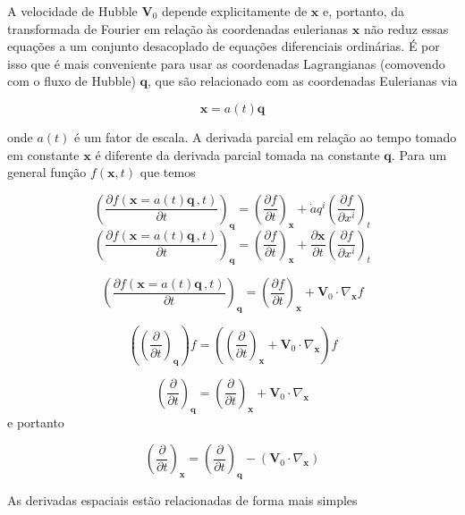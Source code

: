 \documentclass[a4paper,12pt]{article}
\begin{document}
A velocidade de Hubble $\mathbf{V}_0$ depende explicitamente de $\mathbf{x}$ e, portanto, da transformada de Fourier em relação às coordenadas eulerianas $\mathbf{x}$ não reduz essas equações a um conjunto desacoplado de equações diferenciais ordinárias. É por isso que é mais conveniente para usar as coordenadas Lagrangianas (comovendo com o fluxo de Hubble) $\mathbf{q}$, que são relacionado com as coordenadas Eulerianas via

\begin{equation}
	\mathbf{x} = a(t)\mathbf{q}
\end{equation}

onde $a(t)$ é um fator de escala. A derivada parcial em relação ao tempo tomado em
constante $\mathbf{x}$ é diferente da derivada parcial tomada na constante $\mathbf{q}$. Para um general função $f (\mathbf{x}, t)$ que temos

\begin{equation}
	\left( \dfrac{\partial f(\mathbf{x} = a(t)\mathbf{q}\, , t)}{\partial t} \right)_\mathbf{q} = \left( \dfrac{\partial f}{\partial t} \right)_\mathbf{x} + \dot{a}q^i\left( \dfrac{\partial f}{\partial x^i} \right)_t
\end{equation}
$$\left( \dfrac{\partial f(\mathbf{x} = a(t)\mathbf{q}\, , t)}{\partial t} \right)_\mathbf{q} = \left( \dfrac{\partial f}{\partial t} \right)_\mathbf{x} + \dfrac{\partial\mathbf{x}}{\partial t}\left( \dfrac{\partial f}{\partial x^i} \right)_t$$

$$\left( \dfrac{\partial f(\mathbf{x} = a(t)\mathbf{q}\, , t)}{\partial t} \right)_\mathbf{q} = \left( \dfrac{\partial f}{\partial t} \right)_\mathbf{x} + \mathbf{V}_0\cdot\nabla_\mathbf{x} f$$

$$\left(\left( \dfrac{\partial }{\partial t} \right)_\mathbf{q}\right)f =\left(\left( \dfrac{\partial }{\partial t} \right)_\mathbf{x} + \mathbf{V}_0\cdot\nabla_\mathbf{x}\right)  f$$

$$\left( \dfrac{\partial }{\partial t} \right)_\mathbf{q} =\left( \dfrac{\partial }{\partial t} \right)_\mathbf{x} + \mathbf{V}_0\cdot\nabla_\mathbf{x}$$
e portanto

\begin{equation}
	\left(\dfrac{\partial}{\partial t}\right)_\mathbf{x} = \left( \dfrac{\partial}{\partial t} \right)_\mathbf{q} - (\mathbf{V}_0 \cdot \nabla_\mathbf{x})
\end{equation}

As derivadas espaciais estão relacionadas de forma mais simples
\end{document}
